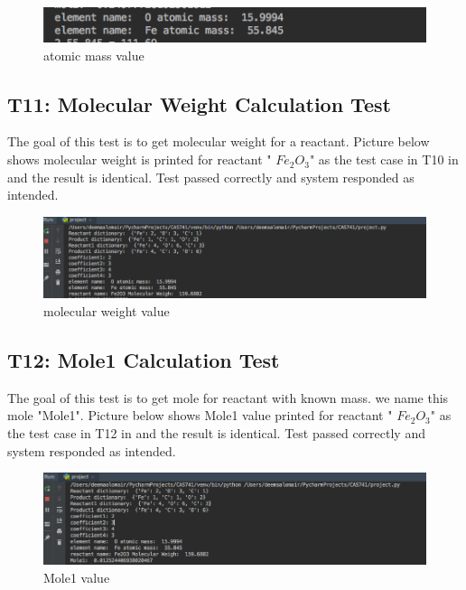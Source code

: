 \documentclass[12pt, titlepage]{article}
\begin{document}
\begin{figure}[H]
 \begin{center}
 \includegraphics [width=\textwidth]{atomicmass}
 \caption{\label{ Figure 17:} atomic mass value}
 \end{center}
 \end{figure}
 
 \subsection{T11: Molecular Weight Calculation Test}

The goal of this test is to get molecular weight for a reactant. Picture below shows molecular weight is printed for reactant " $Fe_2$$O_3$" as the test case in T10 in \cite{UnitVnVPlan} and the result is identical. Test passed correctly and system responded as intended.

\begin{figure}[H]
 \begin{center}
 \includegraphics [width=\textwidth]{molecularweight}
 \caption{\label{ Figure 18:} molecular weight value}
 \end{center}
 \end{figure}
 
\subsection{T12: Mole1 Calculation Test}

The goal of this test is to get mole for reactant with known mass. we name this mole "Mole1". Picture below shows Mole1 value printed for reactant " $Fe_2$$O_3$" as the test case in T12 in \cite{UnitVnVPlan} and the result is identical. Test passed correctly and system responded as intended.

\begin{figure}[H]
 \begin{center}
 \includegraphics [width=\textwidth]{mole1}
 \caption{\label{ Figure 19:} Mole1 value}
 \end{center}
 \end{figure}
\end{document}
